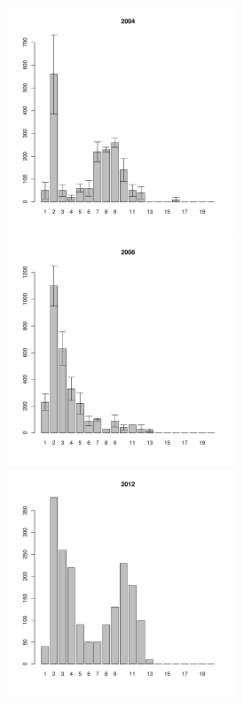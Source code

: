 \begin{figure}[h]

\begin{multicols}{3}
\hfill
\includegraphics[width=60mm]{../White_Sea/Luvenga_Goreliy/middle_2004_.pdf}
\hfill
\includegraphics[width=60mm]{../White_Sea/Luvenga_Goreliy/middle_2008_.pdf}
\hfill
\includegraphics[width=60mm]{../White_Sea/Luvenga_Goreliy/middle_2012_.pdf}
\end{multicols}




\end{figure}
